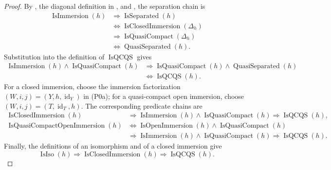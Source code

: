 \begin{proof}
  By
  \cite[\href{https://stacks.math.columbia.edu/tag/01L7}{Tag 01L7}]
  {stacks-project}, the diagonal definition in
  , and
  \cite[\href{https://stacks.math.columbia.edu/tag/01K2}{Tag 01K2}]
  {stacks-project}, the separation chain is
  \[
  \begin{aligned}
    \operatorname{IsImmersion}(h)
      &\Longrightarrow\operatorname{IsSeparated}(h)\\
      &\Longleftrightarrow
        \operatorname{IsClosedImmersion}(\Delta_h)\\
      &\Longrightarrow
        \operatorname{IsQuasiCompact}(\Delta_h)\\
      &\Longleftrightarrow\operatorname{QuasiSeparated}(h).
  \end{aligned}                                                     \tag{QCI1}
  \]
  Substitution into the definition of $\operatorname{IsQCQS}$ gives
  \[
  \begin{aligned}
    \operatorname{IsImmersion}(h)\wedge
      \operatorname{IsQuasiCompact}(h)
      &\Longrightarrow
        \operatorname{IsQuasiCompact}(h)\wedge
        \operatorname{QuasiSeparated}(h)\\
      &\Longleftrightarrow\operatorname{IsQCQS}(h).
  \end{aligned}                                                     \tag{QCI2}
  \]
  For a closed immersion, choose the immersion factorization
  $(W,i,j)=(Y,h,\operatorname{id}_Y)$ in (P0a); for a quasi-compact open
  immersion, choose $(W,i,j)=(T,\operatorname{id}_T,h)$.  The corresponding
  predicate chains are
  \[
  \begin{aligned}
    \operatorname{IsClosedImmersion}(h)
      &\Longrightarrow
        \operatorname{IsImmersion}(h)\wedge
        \operatorname{IsQuasiCompact}(h)
       \Longrightarrow\operatorname{IsQCQS}(h),\\
    \operatorname{IsQuasiCompactOpenImmersion}(h)
      &\Longleftrightarrow
        \operatorname{IsOpenImmersion}(h)\wedge
        \operatorname{IsQuasiCompact}(h)\\
      &\Longrightarrow
        \operatorname{IsImmersion}(h)\wedge
        \operatorname{IsQuasiCompact}(h)
       \Longrightarrow\operatorname{IsQCQS}(h).
  \end{aligned}                                                     \tag{QCI3}
  \]
  Finally, the definitions of an isomorphism and of a closed immersion give
  \[
    \operatorname{IsIso}(h)
      \Longrightarrow\operatorname{IsClosedImmersion}(h)
      \Longrightarrow\operatorname{IsQCQS}(h).                    \tag{QCI4}
  \]
\end{proof}


